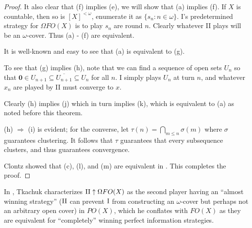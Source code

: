 \documentclass{amsart}
\theoremstyle{plain}
\theoremstyle{definition}
\theoremstyle{remark}
\theoremstyle{plain}
\theoremstyle{definition}
\theoremstyle{remark}
\begin{document}
\begin{proof}
 It also clear that (f) implies (e), we will show that (a) implies (f).
 If \(X\) is countable, then so is \([X]^{<\omega}\), enumerate it as \(\{s_n : n \in \omega\}\).
 I's predetermined strategy for \(\Omega FO(X)\) is to play \(s_n\) are round \(n\).
 Clearly whatever II plays will be an \(\omega\)-cover.
 Thus (a) - (f) are equivalent.

 It is well-known and easy to see that (a) is equivalent to (g).

 To see that (g) implies (h), note that we can find a sequence of open sets \(U_n\) so that \(\mathbf 0 \in U_{n+1} \subseteq \overline{U_{n+1}} \subseteq U_n\) for all \(n\).
 I simply plays \(U_n\) at turn \(n\), and whatever \(x_n\) are played by II must converge to \(x\).

 Clearly (h) implies (j) which in turn implies (k), which is equivalent to (a) as noted before this theorem.

 (h) \(\Rightarrow\) (i) is evident; for the converse, let \(\tau(n)=\bigcap_{m\leq n}\sigma(m)\)
 where \(\sigma\) guarantees clustering. It follows that \(\tau\) guarantees that every subsequence
 clusters, and thus guarantees convergence.

 Clontz showed that (c), (l), and (m) are equivalent in \cite{Clontz1}.
 This completes the proof.

\end{proof}

In \cite{Tkachuk3}, Tkachuk characterizes \(\mathrm{II}\uparrow\Omega FO(X)\) as the second player having an ``almost winning strategy'' (\(\mathrm{II}\) can prevent \(\mathrm{I}\) from constructing an \(\omega\)-cover but perhaps not an arbitrary open cover) in \(PO(X)\), which he conflates with \(FO(X)\) as they are equivalent for ``completely'' winning perfect information strategies. 
\end{document}
